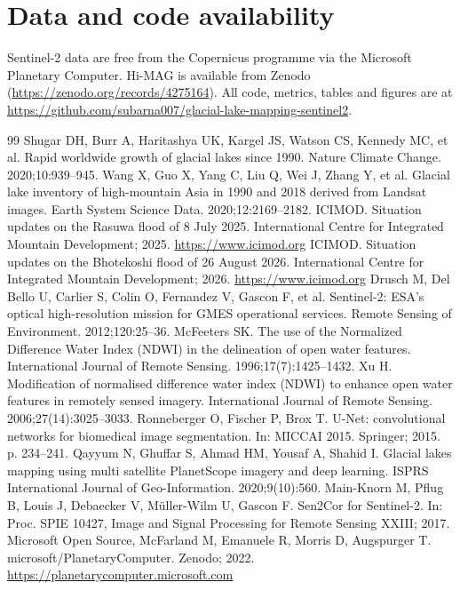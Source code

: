 \documentclass[11pt,a4paper]{article}
\begin{document}
\section*{Data and code availability}
Sentinel-2 data are free from the Copernicus programme via the Microsoft Planetary Computer. Hi-MAG is available from Zenodo (\url{https://zenodo.org/records/4275164}). All code, metrics, tables and figures are at \url{https://github.com/subarna007/glacial-lake-mapping-sentinel2}.

\begin{thebibliography}{99}\small
{} Shugar DH, Burr A, Haritashya UK, Kargel JS, Watson CS, Kennedy MC, et al. Rapid worldwide growth of glacial lakes since 1990. Nature Climate Change. 2020;10:939--945.
 Wang X, Guo X, Yang C, Liu Q, Wei J, Zhang Y, et al. Glacial lake inventory of high-mountain Asia in 1990 and 2018 derived from Landsat images. Earth System Science Data. 2020;12:2169--2182.
 ICIMOD. Situation updates on the Rasuwa flood of 8 July 2025. International Centre for Integrated Mountain Development; 2025. \url{https://www.icimod.org}
 ICIMOD. Situation updates on the Bhotekoshi flood of 26 August 2026. International Centre for Integrated Mountain Development; 2026. \url{https://www.icimod.org}
 Drusch M, Del Bello U, Carlier S, Colin O, Fernandez V, Gascon F, et al. Sentinel-2: ESA's optical high-resolution mission for GMES operational services. Remote Sensing of Environment. 2012;120:25--36.
 McFeeters SK. The use of the Normalized Difference Water Index (NDWI) in the delineation of open water features. International Journal of Remote Sensing. 1996;17(7):1425--1432.
 Xu H. Modification of normalised difference water index (NDWI) to enhance open water features in remotely sensed imagery. International Journal of Remote Sensing. 2006;27(14):3025--3033.
 Ronneberger O, Fischer P, Brox T. U-Net: convolutional networks for biomedical image segmentation. In: MICCAI 2015. Springer; 2015. p. 234--241.
 Qayyum N, Ghuffar S, Ahmad HM, Yousaf A, Shahid I. Glacial lakes mapping using multi satellite PlanetScope imagery and deep learning. ISPRS International Journal of Geo-Information. 2020;9(10):560.
 Main-Knorn M, Pflug B, Louis J, Debaecker V, M\"uller-Wilm U, Gascon F. Sen2Cor for Sentinel-2. In: Proc. SPIE 10427, Image and Signal Processing for Remote Sensing XXIII; 2017.
 Microsoft Open Source, McFarland M, Emanuele R, Morris D, Augspurger T. microsoft/PlanetaryComputer. Zenodo; 2022. \url{https://planetarycomputer.microsoft.com}

\end{thebibliography}
\end{document}
